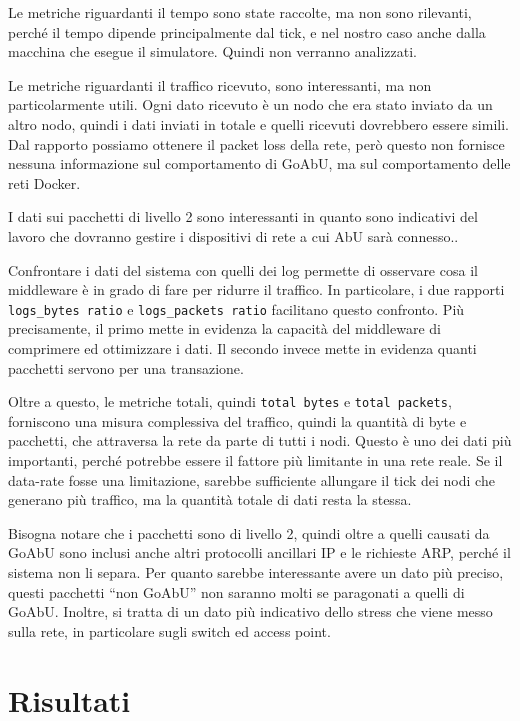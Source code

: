 \documentclass[12pt, a4paper]{article}
\begin{document}
Le metriche riguardanti il tempo sono state raccolte, ma non sono rilevanti, perché il tempo dipende principalmente dal tick, e nel nostro caso anche dalla macchina che esegue il simulatore. Quindi non verranno analizzati.

Le metriche riguardanti il traffico ricevuto, sono interessanti, ma non particolarmente utili. Ogni dato ricevuto è un nodo che era stato inviato da un altro nodo, quindi i dati inviati in totale e quelli ricevuti dovrebbero essere simili.
Dal rapporto possiamo ottenere il packet loss della rete, però questo non fornisce nessuna informazione sul comportamento di GoAbU, ma sul comportamento delle reti Docker.

I dati sui pacchetti di livello 2 sono interessanti in quanto sono indicativi del lavoro che dovranno gestire i dispositivi di rete a cui AbU sarà connesso..

Confrontare i dati del sistema con quelli dei log permette di osservare cosa il middleware è in grado di fare per ridurre il traffico. In particolare, i due rapporti \lstinline{logs_bytes ratio} e \lstinline{logs_packets ratio} facilitano questo confronto.
Più precisamente, il primo mette in evidenza la capacità del middleware di comprimere ed ottimizzare i dati.
Il secondo invece mette in evidenza quanti pacchetti servono per una transazione.

Oltre a questo, le metriche totali, quindi \lstinline{total bytes} e \lstinline{total packets}, forniscono una misura complessiva del traffico, quindi la quantità di byte e pacchetti, che attraversa la rete da parte di tutti i nodi.
Questo è uno dei dati più importanti, perché potrebbe essere il fattore più limitante in una rete reale. Se il data-rate fosse una limitazione, sarebbe sufficiente allungare il tick dei nodi che generano più traffico, ma la quantità totale di dati resta la stessa.

Bisogna notare che i pacchetti sono di livello 2, quindi oltre a quelli causati da GoAbU sono inclusi anche altri protocolli ancillari IP e le richieste ARP, perché il sistema non li separa.
Per quanto sarebbe interessante avere un dato più preciso, questi pacchetti ``non GoAbU'' non saranno molti se paragonati a quelli di GoAbU. Inoltre, si tratta di un dato più indicativo dello stress che viene messo sulla rete, in particolare sugli switch ed access point.

\newpage

\section{Risultati}
\end{document}
